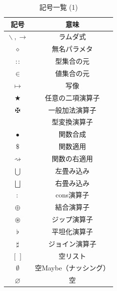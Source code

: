 \documentclass[a5paper,twoside,fleqn,draft]{jsbook}
\newcommand{\mEmptyList}{{[\,]}}
\newcommand{\mNothing}{\emptyset}
\newcommand{\mPureNothing}{\varnothing}
\newcommand{\mAnonParam}{\diamond}
\newcommand{\mUpCast}{\bigtriangleup}
\DeclareMathOperator{\mFromIntegral}{\mUpCast_\text{Integral}}
\DeclareMathOperator{\mAppend}{\oplus}
\DeclareMathOperator{\mApply}{\$}
\DeclareMathOperator{\mApplyRight}{\rightsquigarrow}
\DeclareMathOperator{\mBinOp}{\bigstar}
\DeclareMathOperator{\mComp}{\bullet} %
\DeclareMathOperator{\mConcat}{\flat}
\DeclareMathOperator{\mCons}{:}
\DeclareMathOperator*{\mFold}{\bigcup}
\DeclareMathOperator*{\mFoldRight}{\bigsqcup}
\DeclareMathOperator{\mIn}{{:\!:}}
\DeclareMathOperator{\mJoin}{\sharp}
\DeclareMathOperator{\mLambda}{\backslash}
\DeclareMathOperator{\mLambdaArrow}{\rightarrow}
\DeclareMathOperator{\mMapsTo}{\mapsto}
\DeclareMathOperator{\mPlus}{\maltese}
\DeclareMathOperator{\mZip}{\circledast}
\begin{document}
\begin{table}[p]
\caption{記号一覧 (1)}
\begin{center}
\begin{tabular}{||c|c||}
\hline
記号&意味\\
\hline\hline
$\mLambda, \mLambdaArrow$&ラムダ式\\
$\mAnonParam$&無名パラメタ\\
\hline
$\mIn$&型集合の元\\
$\in$&値集合の元\\
$\mMapsTo$&写像\\
\hline
$\mBinOp$&任意の二項演算子\\
$\mPlus$&一般加法演算子\\
\hline
$\mFromIntegral$&型変換演算子\\
\hline
$\mComp$&関数合成\\
$\mApply$&関数適用\\
$\mApplyRight$&関数の右適用\\
\hline
$\mFold$&左畳み込み\\
$\mFoldRight$&右畳み込み\\
\hline
$\mCons$&cons演算子\\
$\mAppend$&結合演算子\\
$\mZip$&ジップ演算子\\
$\mConcat$&平坦化演算子\\
$\mJoin$&ジョイン演算子\\
\hline
$\mEmptyList$&空リスト\\
$\mNothing$&空Maybe（ナッシング）\\
$\mPureNothing$&空\\
\hline
\end{tabular}
\end{center}
\end{table}
\end{document}

